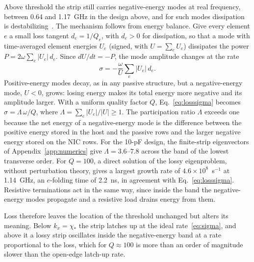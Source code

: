 \documentclass[aps,prapplied,twocolumn,superscriptaddress,floatfix,longbibliography]{revtex4-2}
\begin{document}
Above threshold the strip still carries negative-energy modes at real frequency, between 0.64 and 1.17~GHz in the design above, and for such modes dissipation is destabilizing~\cite{Cairns_1979:JFM,MacKay_1991:PLA,Kirillov_2013:book}. The mechanism follows from energy balance. Give every element $e$ a small loss tangent $d_e=1/Q_e$, with $d_e>0$ for dissipation, so that a mode with time-averaged element energies $U_e$ (signed, with $U=\sum_eU_e$) dissipates the power $P=2\omega\sum_e|U_e|\,d_e$. Since $dU/dt=-P$, the mode amplitude changes at the rate
\begin{equation}
\sigma=-\frac{\omega}{U}\sum_e|U_e|\,d_e .
\label{eq:losssigma}
\end{equation}
Positive-energy modes decay, as in any passive structure, but a negative-energy mode, $U<0$, grows: losing energy makes its total energy more negative and its amplitude larger. With a uniform quality factor $Q$, Eq.~\eqref{eq:losssigma} becomes $\sigma=\Lambda\,\omega/Q$, where $\Lambda=\sum_e|U_e|/|U|\ge1$. The participation ratio $\Lambda$ exceeds one because the net energy of a negative-energy mode is the difference between the positive energy stored in the host and the passive rows and the larger negative energy stored on the NIC rows. For the 10-pF design, the finite-strip eigenvectors of Appendix~\ref{app:numerics} give $\Lambda=3.6$--$7.8$ across the band of the lowest transverse order. For $Q=100$, a direct solution of the lossy eigenproblem, without perturbation theory, gives a largest growth rate of $4.6\times10^8$~s$^{-1}$ at 1.14~GHz, an $e$-folding time of 2.2~ns, in agreement with Eq.~\eqref{eq:losssigma}. Resistive terminations act in the same way, since inside the band the negative-energy modes propagate and a resistive load drains energy from them.

Loss therefore leaves the location of the threshold unchanged but alters its meaning. Below $k_x=\chi_*$ the strip latches up at the ideal rate~\eqref{eq:sigma}, and above it a lossy strip oscillates inside the negative-energy band at a rate proportional to the loss, which for $Q\approx100$ is more than an order of magnitude slower than the open-edge latch-up rate.
\end{document}
